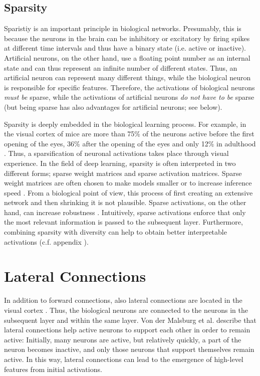 \subsection{Sparsity}
Sparistiy is an important principle in biological networks.
Presumably, this is because the neurons in the brain can be inhibitory or excitatory by firing spikes at different time intervals and thus have a binary state (i.e. active or inactive). Artificial neurons, on the other hand, use a floating point number as an internal state and can thus represent an infinite number of different states.
Thus, an artificial neuron can represent many different things, while the biological neuron is responsible for specific features.
Therefore, the activations of biological neurons \emph{must be} sparse, while the activations of artificial neurons \emph{do not have to be} sparse (but being sparse has also advantages for artificial neurons; see below).

Sparsity is deeply embedded in the biological learning process.
For example, in the visual cortex of mice are more than 75\% of the neurons active before the first opening of the eyes, 36\% after the opening of the eyes and only 12\% in adulthood .
Thus, a sparsification of neuronal activations takes place through visual experience.
In the field of deep learning, sparsity is often interpreted in two different forms; sparse weight matrices and sparse activation matrices.
Sparse weight matrices are often chosen to make models smaller or to increase inference speed .
From a biological point of view, this process of first creating an extensive network and then shrinking it is not plausible.
Sparse activations, on the other hand, can increase robustness \cite{Panousis_Chatzis_Theodoridis_2021}.
Intuitively, sparse activations enforce that only the most relevant information is passed to the subsequent layer.
Furthermore, combining sparsity with diversity can help to obtain better interpretable activations (c.f. appendix ).

\section{Lateral Connections}
In addition to forward connections, also lateral connections are located in the visual cortex .
Thus, the biological neurons are connected to the neurons in the subsequent layer and within the same layer.
Von der Malsburg et al. \cite{von_der_Malsburg_Stadelmann_Grewe_2022} describe that lateral connections help active neurons to support each other in order to remain active:
Initially, many neurons are active, but relatively quickly, a part of the neuron becomes inactive, and only those neurons that support themselves remain active. In this way, lateral connections can lead to the emergence of high-level features from initial activations.

